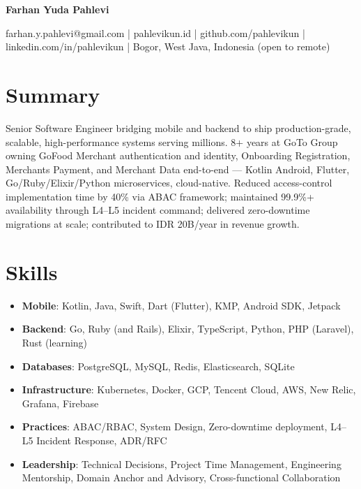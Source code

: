 \documentclass[10pt]{article}
\begin{document}
 
{\LARGE \textbf{Farhan Yuda Pahlevi}}
 
farhan.y.pahlevi@gmail.com | pahlevikun.id | github.com/pahlevikun | linkedin.com/in/pahlevikun | Bogor, West Java, Indonesia (open to remote)
 
\section*{Summary}
Senior Software Engineer bridging mobile and backend to ship production-grade, scalable, high-performance systems serving millions. 8+ years at GoTo Group owning GoFood Merchant authentication and identity, Onboarding Registration, Merchants Payment, and Merchant Data end-to-end --- Kotlin Android, Flutter, Go/Ruby/Elixir/Python microservices, cloud-native. Reduced access-control implementation time by 40\% via ABAC framework; maintained 99.9\%+ availability through L4--L5 incident command; delivered zero-downtime migrations at scale; contributed to IDR 20B/year in revenue growth.
 
\section*{Skills}
\begin{itemize}
\item \textbf{Mobile}: Kotlin, Java, Swift, Dart (Flutter), KMP, Android SDK, Jetpack
\item \textbf{Backend}: Go, Ruby (and Rails), Elixir, TypeScript, Python, PHP (Laravel), Rust (learning)
\item \textbf{Databases}: PostgreSQL, MySQL, Redis, Elasticsearch, SQLite
\item \textbf{Infrastructure}: Kubernetes, Docker, GCP, Tencent Cloud, AWS, New Relic, Grafana, Firebase
\item \textbf{Practices}: ABAC/RBAC, System Design, Zero-downtime deployment, L4--L5 Incident Response, ADR/RFC
\item \textbf{Leadership}: Technical Decisions, Project Time Management, Engineering Mentorship, Domain Anchor and Advisory, Cross-functional Collaboration
\end{itemize}
 
\end{document}
